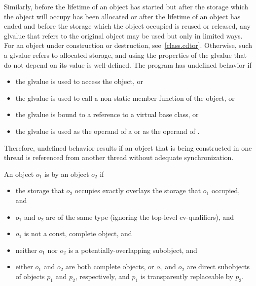 \pnum
Similarly, before the lifetime of an object has started but after the
storage which the object will occupy has been allocated or after the
lifetime of an object has ended and before the storage which the object
occupied is reused or released, any glvalue that refers to the original
object may be used but only in limited ways.
For an object under construction or destruction, see~\ref{class.cdtor}.
Otherwise, such
a glvalue refers to
allocated storage, and using the
properties of the glvalue that do not depend on its value is
well-defined. The program has undefined behavior if
\begin{itemize}
\item the glvalue is used to access the object, or
\item the glvalue is used to call a non-static member function of the object, or
\item the glvalue is bound to a reference to a virtual base class, or
\item the glvalue is used as the operand of a
 or as the operand of
.
\end{itemize}

\begin{note}
Therefore, undefined behavior results
if an object that is being constructed in one thread is referenced from another
thread without adequate synchronization.
\end{note}

\pnum
An object $o_1$ is  by an object $o_2$ if
\begin{itemize}
\item the storage that $o_2$ occupies exactly overlays
the storage that $o_1$ occupied, and

\item $o_1$ and $o_2$ are of the same type
(ignoring the top-level cv-qualifiers), and

\item $o_1$ is not a const, complete object, and

\item neither $o_1$ nor $o_2$
is a potentially-overlapping subobject, and

\item either $o_1$ and $o_2$ are both complete objects, or
$o_1$ and $o_2$ are direct subobjects of objects $p_1$ and $p_2$, respectively,
and $p_1$ is transparently replaceable by $p_2$.
\end{itemize}

